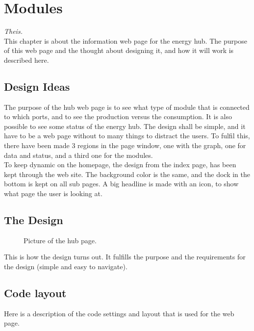 \newpage
\chapter{Modules}\textit{Theis.}\\
This chapter is about the information web page for the energy hub. The purpose of this web page and the thought about designing it, and how it will work is described here.
\section{Design Ideas}
The purpose of the hub web page is to see what type of module that is connected to which ports, and to see the production versus the consumption. It is also possible to see some status of the energy hub. The design shall be simple, and it have to be a web page without to many things to distract the users. To fulfil this, there have been made 3 regions in the page window, one with the graph, one for data and status, and a third one for the modules.\\
To keep dynamic on the homepage, the design from the index page, has been kept through the web site. The background color is the same, and the dock in the bottom is kept on all sub pages. A big headline is made with an icon, to show what page the user is looking at.
\section{The Design}

\begin{figure}[h!]
	\center
		\setlength\fboxsep{0pt}
		\setlength\fboxrule{1pt}
   	\caption{Picture of the hub page.}
   	\label{fig:hub_page_design}
\end{figure}
This is how the design turns out. It fulfills the purpose and the requirements for the design (simple and easy to navigate).
\section{Code layout}
Here is a description of the code settings and layout that is used for the web page.
